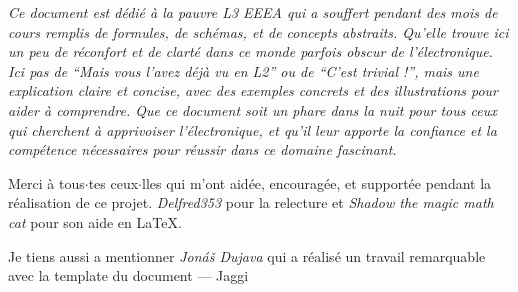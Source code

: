 \cleardoublepage
{}

{ \slshape
    Ce document est d\'edi\'e \`a la pauvre L3 EEEA qui a souffert pendant des mois de cours remplis de formules, de sch\'emas, et de concepts abstraits. Qu'elle trouve ici un peu de r\'econfort et de clart\'e dans ce monde parfois obscur de l'\'electronique. Ici pas de ``Mais vous l'avez d\'ej\`a vu en L2'' ou de ``C'est trivial !'', mais une explication claire et concise, avec des exemples concrets et des illustrations pour aider \`a comprendre. Que ce document soit un phare dans la nuit pour tous ceux qui cherchent \`a apprivoiser l'\'electronique, et qu'il leur apporte la confiance et la comp\'etence n\'ecessaires pour r\'eussir dans ce domaine fascinant.\par
    \bigskip
    Merci \`a tous$\cdot$tes ceux$\cdot$lles qui m'ont aid\'ee, encourag\'ee, et support\'ee pendant la r\'ealisation de ce projet. \emph{Delfred353} pour la relecture et \emph{Shadow the magic math cat} pour son aide en \LaTeX.\par
    \bigskip
    Je tiens aussi a mentionner \emph{Jon\'a\v{s} Dujava} qui a r\'ealis\'e un travail remarquable avec la template du document \autocite{TeXtured}
    --- Jaggi
}

\vfill
